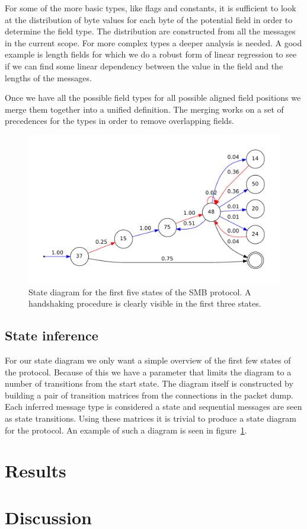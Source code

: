 \documentclass[a4paper,twocolumn]{article}
\begin{document}
For some of the more basic types, like flags and constants, it is sufficient to
look at the distribution of byte values for each byte of the potential field in
order to determine the field type. The distribution are constructed from all
the messages in the current scope. For more complex types a deeper analysis is
needed. A good example is length fields for which we do a robust form of linear
regression to see if we can find some linear dependency between the value in
the field and the lengths of the messages.

Once we have all the possible field types for all possible aligned field
positions we merge them together into a unified definition. The merging works
on a set of precedences for the types in order to remove overlapping fields.

\begin{figure}[h]
    \includegraphics[width=\linewidth]{img/smbstate}
    \caption{State diagram for the first five states of the SMB protocol. A
        handshaking procedure is clearly visible in the first three states.}
    \label{fig:smbstate}
\end{figure}

\subsection{State inference}
For our state diagram we only want a simple overview of the first few states
of the protocol. Because of this we have a parameter that limits the diagram to
a number of transitions from the start state. The diagram itself is constructed
by building a pair of transition matrices from the connections in the packet
dump. Each inferred message type is considered a state and sequential messages
are seen as state transitions. Using these matrices it is trivial to produce a
state diagram for the protocol. An example of such a diagram is seen in
figure~\ref{fig:smbstate}.

\section{Results}

\section{Discussion}
\end{document}
